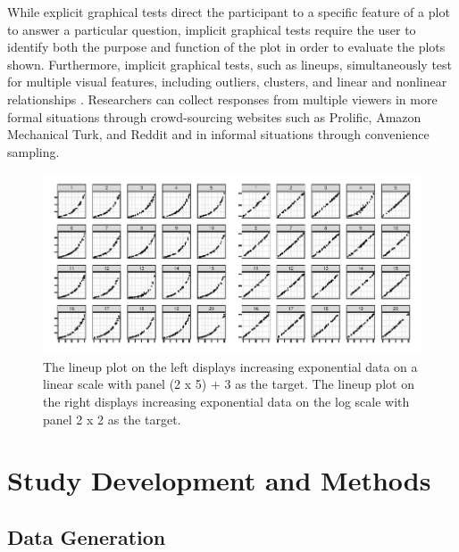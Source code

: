 \documentclass[12pt]{article}
\begin{document}
While explicit graphical tests direct the participant to a specific
feature of a plot to answer a particular question, implicit graphical
tests require the user to identify both the purpose and function of the
plot in order to evaluate the plots shown. Furthermore, implicit
graphical tests, such as lineups, simultaneously test for multiple
visual features, including outliers, clusters, and linear and nonlinear
relationships \citep{vanderplas_testing_2020}. Researchers can collect
responses from multiple viewers in more formal situations through
crowd-sourcing websites such as Prolific, Amazon Mechanical Turk, and
Reddit and in informal situations through convenience sampling.

\begin{figure}[tbp]

{\centering \includegraphics[width=\linewidth,]{logarithmic-lineups_files/figure-latex/lineup-example-1} 

}

\caption[Lineup examples]{The lineup plot on the left displays increasing exponential data on a linear scale with panel (2 x 5) + 3 as the target. The lineup plot on the right displays increasing exponential data on the log scale with panel 2 x 2 as the target.}\label{fig:lineup-example}
\end{figure}

\hypertarget{study-development-and-methods}{%
\section{Study Development and
Methods}\label{study-development-and-methods}}

\hypertarget{data-generation}{%
\subsection{Data Generation}\label{data-generation}}
\end{document}
